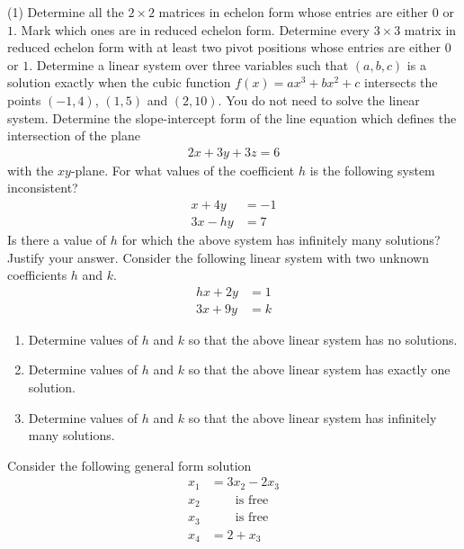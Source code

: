 \begin{tasks}[resume, style=enumerate](1)
\task
  Determine all the $2 \times 2$ matrices in echelon form whose
  entries are either $0$ or $1$.  Mark which ones are in reduced
  echelon form.
\task
  Determine every $3 \times 3$ matrix in reduced echelon form with at
  least two pivot positions whose entries are either $0$ or $1$.
\task
  Determine a linear system over three variables such that $(a, b, c)$
  is a solution exactly when the cubic function $f(x) = ax^3 + bx^2 +
  c$ intersects the points $(-1, 4)$, $(1, 5)$ and $(2, 10)$.  You do
  not need to solve the linear system.
\task
  Determine the slope-intercept form of the line equation which
  defines the intersection of the plane
  \begin{align*}
    2x + 3y + 3z = 6
  \end{align*}
  with the $xy$-plane.
\task
  For what values of the coefficient $h$ is the following system
  inconsistent?
  \begin{align*}
    x + 4y &= -1 \\
    3x - hy &= 7
  \end{align*}
  Is there a value of $h$ for which the above system has infinitely
  many solutions? Justify your answer.
\task
  Consider the following linear system with two unknown coefficients
  $h$ and $k$.
  \begin{align*}
    hx + 2y &= 1 \\
    3x + 9y &= k
  \end{align*}
  \begin{enumerate}[label=(\alph*)]
  \item
    Determine values of $h$ and $k$ so that the above linear system
    has no solutions.
  \item
    Determine values of $h$ and $k$ so that the above linear system
    has exactly one solution.
  \item
    Determine values of $h$ and $k$ so that the above linear system
    has infinitely many solutions.
  \end{enumerate}
\task
  Consider the following general form solution
  \begin{align*}
    x_1 &= 3x_2 - 2x_3 \\
    x_2 &\qquad \text{is free} \\
    x_3 &\qquad \text{is free} \\
    x_4 &= 2 + x_3
  \end{align*}
  \begin{enumerate}[label=(\alph*)]

\end{enumerate}
\end{tasks}
